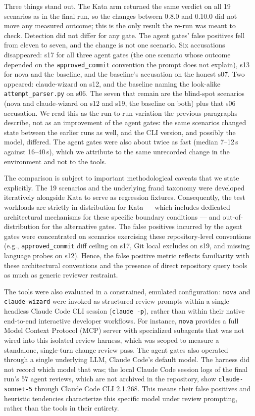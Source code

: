 \documentclass{sbc2019}%
\begin{document}
Three things stand out. The Kata arm returned the same verdict on all 19
scenarios as in the final run, so the changes between 0.8.0 and 0.10.0 did
not move any measured outcome; this is the only result the re-run was meant to
check. Detection did not differ for any gate. The agent gates' false
positives fell from eleven to seven, and the change is not one scenario.
Six accusations disappeared: s17 for all three agent gates (the one scenario
whose outcome depended on the \texttt{approved\_commit} convention the prompt
does not explain), s13 for nova and the baseline, and the baseline's
accusation on the honest s07. Two appeared: claude-wizard on s12, and the
baseline naming the look-alike \texttt{attempt\_parser.py} on s06. The seven
that remain are the blind-spot scenarios (nova and claude-wizard on s12 and
s19, the baseline on both) plus that s06 accusation. We read this as the
run-to-run variation the previous paragraphs describe, not as an improvement
of the agent gates: the same scenarios changed state between the earlier runs
as well, and the CLI version, and possibly the model, differed. The agent gates were also about twice as fast (median 7--12\,s
against 16--40\,s), which we attribute to the same unrecorded change in the
environment and not to the tools.

The comparison is subject to important methodological caveats that we state explicitly.
The 19 scenarios and the underlying fraud taxonomy were developed iteratively alongside Kata to serve as regression fixtures. Consequently, the test workloads are strictly in-distribution for Kata --- which includes dedicated architectural mechanisms for these specific boundary conditions --- and out-of-distribution for the alternative gates. The false positives incurred by the agent gates were concentrated on scenarios exercising these repository-level conventions (e.g., \texttt{approved\_commit} diff ceiling on s17, Git local excludes on s19, and missing language probes on s12). Hence, the false positive metric reflects familiarity with these architectural conventions and the presence of direct repository query tools as much as generic reviewer restraint.

The tools were also evaluated in a constrained, emulated configuration: \texttt{nova} and \texttt{claude-wizard} were invoked as structured review prompts within a single headless Claude Code CLI session (\texttt{claude -p}), rather than within their native end-to-end interactive developer workflows. For instance, \texttt{nova} provides a full Model Context Protocol (MCP) server with specialized subagents that was not wired into this isolated review harness, which was scoped to measure a standalone, single-turn change review pass. The agent gates also operated through a single underlying LLM, Claude Code's default model. The harness did not record which model that was; the local Claude Code session logs of the final run's 57 agent reviews, which are not archived in the repository, show \texttt{claude-sonnet-5} through Claude Code CLI 2.1.268. This means their false positives and heuristic tendencies characterize this specific model under review prompting, rather than the tools in their entirety.
\end{document}
